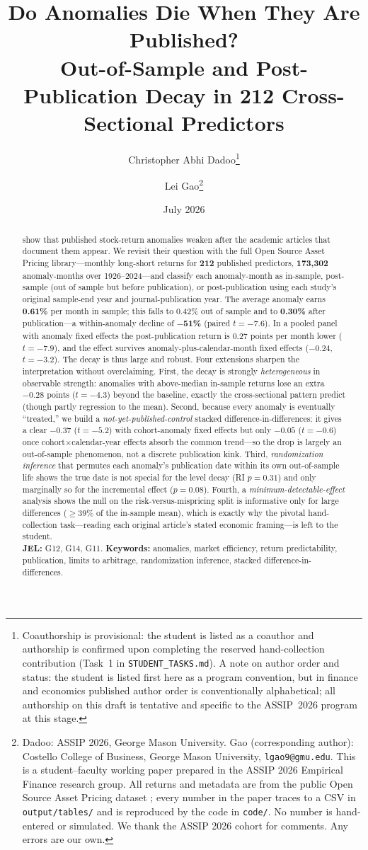 \documentclass[12pt]{article}
\title{\textbf{Do Anomalies Die When They Are Published?\\
Out-of-Sample and Post-Publication Decay in 212 Cross-Sectional Predictors}}
\author{Christopher Abhi Dadoo\thanks{Coauthorship is provisional: the student is listed as a coauthor and authorship is confirmed upon completing the reserved hand-collection contribution (Task~1 in \texttt{STUDENT\_TASKS.md}). A note on author order and status: the student is listed first here as a program convention, but in finance and economics published author order is conventionally alphabetical; all authorship on this draft is tentative and specific to the ASSIP~2026 program at this stage.} \and Lei Gao\thanks{Dadoo: ASSIP 2026, George Mason
University. Gao (corresponding author): Costello College of Business, George Mason University,
\texttt{lgao9@gmu.edu}. This is a student--faculty working paper prepared in the ASSIP 2026
Empirical Finance research group. All returns and metadata are from the public Open Source
Asset Pricing dataset \citep{chenzimmermann2022}; every number in the paper traces to a CSV in
\texttt{output/tables/} and is reproduced by the code in \texttt{code/}. No number is
hand-entered or simulated. We thank the ASSIP 2026 cohort for comments. Any errors are our
own.}}
\date{July 2026}
\begin{document}
\maketitle

\begin{abstract}
\noindent \citet{mcleanpontiff2016} show that published stock-return anomalies weaken after
the academic articles that document them appear. We revisit their question with the full
Open Source Asset Pricing library---monthly long-short returns for \textbf{212} published
predictors, \textbf{173{,}302} anomaly-months over 1926--2024---and classify each
anomaly-month as in-sample, post-sample (out of sample but before publication), or
post-publication using each study's original sample-end year and journal-publication year.
The average anomaly earns \textbf{0.61\%} per month in sample; this falls to 0.42\% out of
sample and to \textbf{0.30\%} after publication---a within-anomaly decline of
\textbf{$-$51\%} (paired $t=-7.6$). In a pooled panel with anomaly fixed effects the
post-publication return is $0.27$ points per month lower ($t=-7.9$), and the effect survives
anomaly-plus-calendar-month fixed effects ($-0.24$, $t=-3.2$). The decay is thus large and
robust. Four extensions sharpen the interpretation without overclaiming. First, the decay is
strongly \emph{heterogeneous} in observable strength: anomalies with above-median in-sample
returns lose an extra $-0.28$ points ($t=-4.3$) beyond the baseline, exactly the
cross-sectional pattern \citet{mcleanpontiff2016} predict (though partly regression to the
mean). Second, because every anomaly is eventually ``treated,'' we build a \emph{not-yet-published-control}
stacked difference-in-differences: it gives a clear $-0.37$ ($t=-5.2$) with cohort-anomaly
fixed effects but only $-0.05$ ($t=-0.6$) once cohort$\times$calendar-year effects absorb the
common trend---so the drop is largely an out-of-sample phenomenon, not a discrete publication
kink. Third, \emph{randomization inference} that permutes each anomaly's publication date
within its own out-of-sample life shows the true date is not special for the level decay (RI
$p=0.31$) and only marginally so for the incremental effect ($p=0.08$). Fourth, a
\emph{minimum-detectable-effect} analysis shows the null on the risk-versus-mispricing split is
informative only for large differences ($\ge$39\% of the in-sample mean), which is exactly why
the pivotal hand-collection task---reading each original article's stated economic framing---is
left to the student.\\[4pt]
\noindent\textbf{JEL:} G12, G14, G11. \quad
\textbf{Keywords:} anomalies, market efficiency, return predictability, publication, limits to
arbitrage, randomization inference, stacked difference-in-differences.
\end{abstract}
\end{document}
